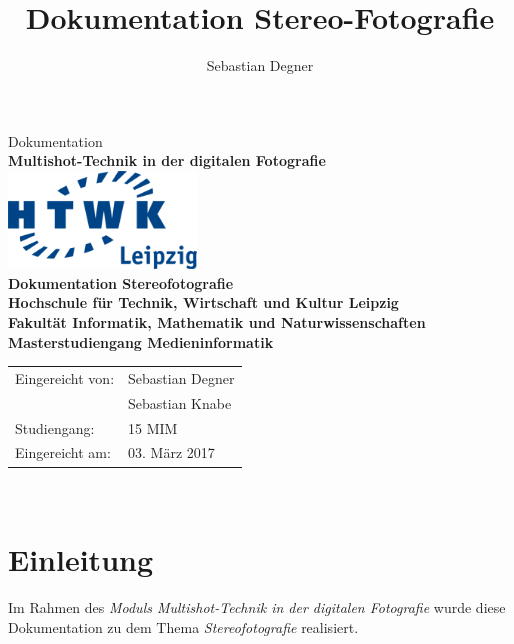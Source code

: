 \documentclass[liststotoc,bibtotoc,fontsize=14pt,]{scrreprt}
\title{Dokumentation Stereo-Fotografie}
\author{Sebastian Degner}
\begin{document}
	
	\begin{titlepage}
		\begin{center}
			\vspace{2cm}
			Dokumentation\\ \textbf{Multishot-Technik in der digitalen Fotografie}\\ 
			\vspace{2,5cm}
			\includegraphics[width=5cm]{HTWK_Logo_RGB-transparent_250.png}\\
			
			\vspace{2,5cm}
			\huge \textbf{\textsf{Dokumentation Stereofotografie}} \\
			\vspace{3cm}
			\fontsize{15}{18} \textbf{Hochschule für Technik, Wirtschaft und Kultur
				Leipzig\\ Fakultät Informatik, Mathematik und Naturwissenschaften\\   Masterstudiengang Medieninformatik}\\
			\vspace{3cm}
		\end{center}
		\normalsize{
			\begin{tabular}{ll}
				Eingereicht von: & {Sebastian Degner} \\
				 & {Sebastian Knabe} \\
				Studiengang: & 15 MIM\\
				Eingereicht am: & 03. März 2017 \\
			\end{tabular}\\
		}
		
	\end{titlepage}
	
	\tableofcontents
	\clearpage
	\listoffigures

	\chapter{Einleitung}
	\label{ch:einleitung}
	Im Rahmen des \textit{Moduls Multishot-Technik in der digitalen Fotografie} wurde diese Dokumentation zu dem Thema \textit{Stereofotografie} realisiert. 
\end{document}
